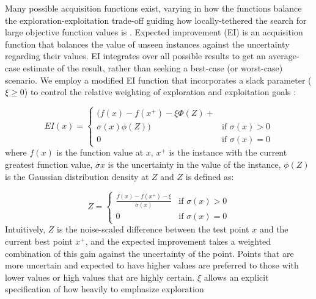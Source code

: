 \documentclass[letterpaper]{article}
\begin{document}
Many possible acquisition functions exist, varying in how the functions balance the exploration-exploitation trade-off guiding how locally-tethered the search for large objective function values is \cite{settles2012:al-book}. Expected improvement (EI) is an acquisition function that balances the value of unseen instances against the uncertainty regarding their values. EI integrates over all possible results to get an average-case estimate of the result, rather than seeking a best-case (or worst-case) scenario. We employ a modified EI function that incorporates a slack parameter ($\xi \ge 0$) to control the relative weighting of exploration and exploitation goals \cite{lizotte2008}:

$$ EI(x) = \begin{cases} 
(f(x) - f(x^{+}) - \xi \Phi(Z) + \\ \sigma(x) \phi(Z)) & \mbox{if } \sigma(x) > 0 \\ 
0 & \mbox{if } \sigma(x) = 0 
\end{cases} $$
where $f(x)$ is the function value at $x$, $x^{+}$ is the instance with the current greatest function value, $\sigma{x}$ is the uncertainty in the value of the instance, $\phi(Z)$ is the Gaussian distribution density at $Z$ and $Z$ is defined as:

$$ Z = \begin{cases} 
\frac{f(x) - f(x^{+}) - \xi}{\sigma(x)} & \mbox{if } \sigma(x) > 0 \\ 
0 & \mbox{if } \sigma(x) = 0 
\end{cases} $$
Intuitively, $Z$ is the noise-scaled difference between the test point $x$ and the current best point $x^{+}$, and the expected improvement takes a weighted combination of this gain against the uncertainty of the point. Points that are more uncertain and expected to have higher values are preferred to those with lower values or high values that are highly certain. $\xi$ allows an explicit specification of how heavily to emphasize exploration
\end{document}
